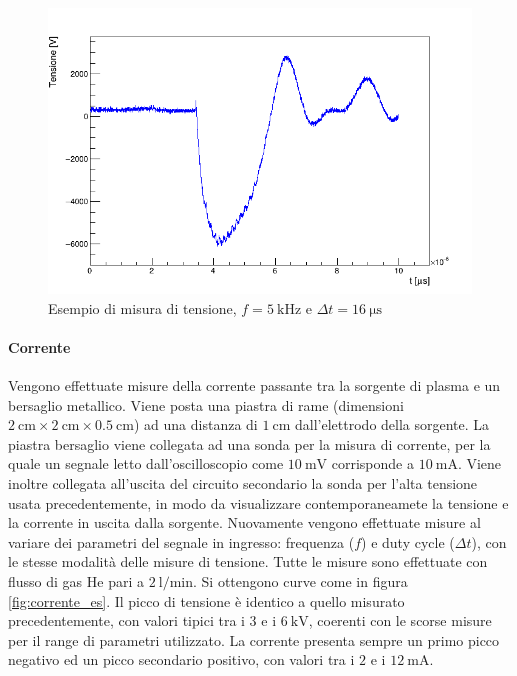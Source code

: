 \begin{figure}
\centering
\includegraphics[width=.7\textwidth]{Immagini/tensione_es_2.png}
\caption{Esempio di misura di tensione, $f = \SI{5}{\kilo\hertz}$ e $\Delta t = \SI{16}{\micro\second}$}
\label{fig:tensione_es}
\end{figure}

\paragraph{Corrente}Vengono effettuate misure della corrente passante tra la sorgente di plasma e un bersaglio metallico. Viene posta una piastra di rame (dimensioni $\SI{2}{\centi\metre} \times \SI{2}{\centi\metre} \times \SI{0.5}{\centi\metre}$) ad una distanza di $\SI{1}{\centi\metre}$ dall'elettrodo della sorgente. La piastra bersaglio viene collegata ad una sonda per la misura di corrente, per la quale un segnale letto dall'oscilloscopio come $\SI{10}{\milli\volt}$ corrisponde a $\SI{10}{\milli\ampere}$.
Viene inoltre collegata all'uscita del circuito secondario la sonda per l'alta tensione usata precedentemente, in modo da visualizzare contemporaneamete la tensione e la corrente in uscita dalla sorgente. Nuovamente vengono effettuate misure al variare dei parametri del segnale in ingresso: frequenza ($f$) e duty cycle ($\Delta t$), con le stesse modalità delle misure di tensione.
Tutte le misure sono effettuate con flusso di gas He pari a $\SI{2}{\litre/\minute}$.
Si ottengono curve come in figura \ref{fig:corrente_es}. Il picco di tensione è identico a quello misurato precedentemente, con valori tipici tra i $\num{3}$ e i $\SI{6}{\kilo\volt}$, coerenti con le scorse misure per il range di parametri utilizzato. La corrente presenta sempre un primo picco negativo ed un picco secondario positivo, con valori tra i $\num{2}$ e i $\SI{12}{\milli\ampere}$.

